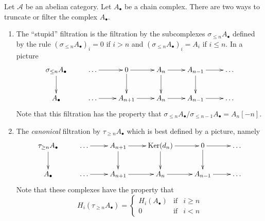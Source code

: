 \noindent
Let $\mathcal{A}$ be an abelian category.
Let $A_\bullet$ be a chain complex. There
are two ways to truncate or filter the complex $A_\bullet$.
\begin{enumerate}
\item The ``stupid'' filtration is the filtration by
the subcomplexes $\sigma_{\leq n} A_\bullet$ defined
by the rule $(\sigma_{\leq n} A_\bullet)_i = 0$ if
$i > n$ and $(\sigma_{\leq n} A_\bullet)_i = A_i$ if
$i \leq n$. In a picture
$$
\xymatrix{
\sigma_{\leq n}A_\bullet \ar[d]  &
\ldots \ar[r] &
0 \ar[r] \ar[d] &
A_n \ar[r] \ar[d] &
A_{n - 1} \ar[r] \ar[d] &
\ldots \\
A_\bullet  &
\ldots \ar[r] &
A_{n + 1} \ar[r] &
A_n \ar[r] &
A_{n - 1} \ar[r] &
\ldots
}
$$
Note that this filtration has the property that
$\sigma_{\leq n}A_\bullet / \sigma_{\leq n - 1}A_\bullet
= A_n[-n]$.
\item The {\it canonical} filtration by $\tau_{\geq n}A_\bullet$
which is best defined by a picture, namely
$$
\xymatrix{
\tau_{\geq n}A_\bullet \ar[d]  &
\ldots \ar[r] &
A_{n + 1} \ar[r] \ar[d] &
\text{Ker}(d_n) \ar[r] \ar[d] &
0 \ar[r] \ar[d] &
\ldots \\
A_\bullet  &
\ldots \ar[r] &
A_{n + 1} \ar[r] &
A_n \ar[r] &
A_{n - 1} \ar[r] &
\ldots
}
$$
Note that these complexes have the property that
$$
H_i(\tau_{\geq n}A_\bullet) =
\left\{
\begin{matrix}
H_i(A_\bullet) & \text{if} & i \geq n \\
0 & \text{if} & i < n
\end{matrix}
\right.
$$
\end{enumerate}

